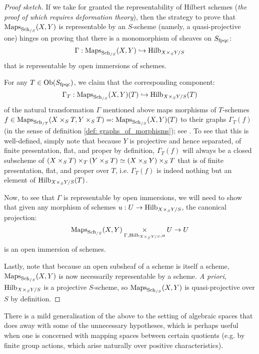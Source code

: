                 \begin{proof}[Proof sketch]
                    If we take for granted the representability of Hilbert schemes (\textit{the proof of which requires deformation theory}), then the strategy to prove that $\mathrm{Maps}_{\mathrm{Sch}_{/S}}(X, Y)$ is representable by an $S$-scheme (namely, a quasi-projective one) hinges on proving that there is a monomorphism of sheaves on $S_{\mathrm{fpqc}}$:
                        $$\Gamma: \Maps_{\Sch_{/S}}(X, Y) \hookrightarrow \Hilb_{X \x_S Y/S}$$
                    that is representable by open immersions of schemes.

                    For any $T \in \mathrm{Ob}(S_{\mathrm{fpqc}})$, we claim that the corresponding component:
                        $$\Gamma_T: \Maps_{\Sch_{/S}}(X, Y)(T) \hookrightarrow \Hilb_{X \x_S Y/S}(T)$$
                    of the natural transformation $\Gamma$ mentioned above maps morphisms of $T$-schemes $f \in \Maps_{\Sch_{/T}}(X \x_S T, Y \x_S T) =: \Maps_{\Sch_{/S}}(X, Y)(T)$ to their graphs $\Gamma_T(f)$ (in the sense of definition \ref{def: graphs_of_morphisms}); see \cite[\href{https://stacks.math.columbia.edu/tag/0D1A}{Tag 0D1A}]{stacks}. To see that this is well-defined, simply note that because $Y$ is projective and hence separated, of finite presentation, flat, and proper by definition, $\Gamma_T(f)$ will always be a closed subscheme of $(X \x_S T) \x_T (Y \x_S T) \cong (X \x_S Y) \x_S T$ that is of finite presentation, flat, and proper over $T$, i.e. $\Gamma_T(f)$ is indeed nothing but an element of $\Hilb_{X \x_S Y/S}(T)$.

                    Now, to see that $\Gamma$ is representable by open immersions, we will need to show that given any morphism of schemes $u: U \to \Hilb_{X \x_S Y/S}$, the canonical projection:
                        $$\Maps_{\Sch_{/S}}(X, Y) \x_{ \Gamma, \Hilb_{X \x_S Y/S}, u } U \to U$$
                    is an open immersion of schemes. 

                    Lastly, note that because an open subsheaf of a scheme is itself a scheme, $\mathrm{Maps}_{\mathrm{Sch}_{/S}}(X, Y)$ is now necessarily representable by a scheme. \textit{A priori}, $\Hilb_{X \x_S Y/S}$ is a projective $S$-scheme, so $\mathrm{Maps}_{\mathrm{Sch}_{/S}}(X, Y)$ is quasi-projective over $S$ by definition.
                \end{proof}
            There is a mild generalisation of the above to the setting of algebraic spaces that does away with some of the unnecessary hypotheses, which is perhaps useful when one is concerned with mapping spaces between certain quotients (e.g. by finite group actions, which arise naturally over positive characteristics).
            \begin{proposition}
                
            \end{proposition}
    
    \printbibliography

